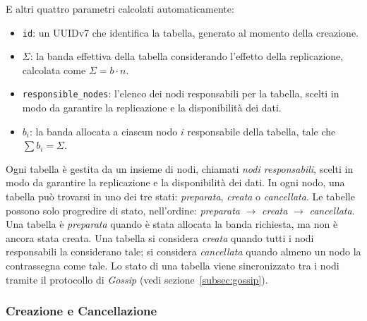 E altri quattro parametri calcolati automaticamente:
\begin{itemize}
    \item \texttt{id}: un UUIDv7 che identifica la tabella, generato al momento della creazione.
    \item $\Sigma$: la banda effettiva della tabella considerando l'effetto della replicazione, calcolata come $\displaystyle \Sigma = b \cdot n$.
    \item \texttt{responsible\_nodes}: l'elenco dei nodi responsabili per la tabella, scelti in modo da garantire la replicazione e la disponibilità dei dati.
    \item $b_i$: la banda allocata a ciascun nodo $i$ responsabile della tabella, tale che $\displaystyle \sum b_i = \Sigma$.
\end{itemize}

Ogni tabella è gestita da un insieme di nodi, chiamati \emph{nodi responsabili}, scelti in modo da garantire la replicazione e la disponibilità dei dati.
In ogni nodo, una tabella può trovarsi in uno dei tre stati: \emph{preparata}, \emph{creata} o \emph{cancellata}.
Le tabelle possono solo progredire di stato, nell'ordine: \emph{preparata} $\rightarrow$ \emph{creata} $\rightarrow$ \emph{cancellata}.
Una tabella è \emph{preparata} quando è stata allocata la banda richiesta, ma non è ancora stata creata.
Una tabella si considera \emph{creata} quando tutti i nodi responsabili la considerano tale; si considera \emph{cancellata} quando almeno un nodo la contrassegna come tale.
Lo stato di una tabella viene sincronizzato tra i nodi tramite il protocollo di \emph{Gossip} (vedi sezione~\ref{subsec:gossip}).

\subsubsection{Creazione e Cancellazione}
\label{subsubsec:creazione-cancellazione}

